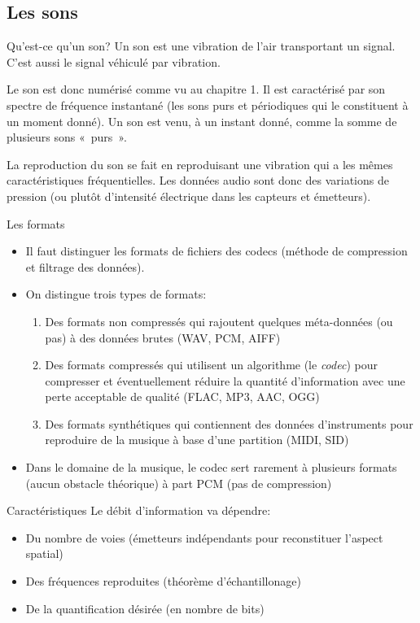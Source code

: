 \subsection{Les sons}
\begin{frame}{Qu'est-ce qu'un son?}
  Un son est une vibration de l'air transportant un signal. C'est aussi le
  signal véhiculé par vibration.

  Le son est donc numérisé comme vu au chapitre 1. Il est caractérisé par son
  spectre de fréquence instantané (les sons purs et périodiques qui le
  constituent à un moment donné). Un son est venu, à un instant donné, comme
  la somme de plusieurs sons «~purs~».
  
  La reproduction du son se fait en reproduisant une vibration qui a les mêmes
  caractéristiques fréquentielles. Les données audio sont donc des variations
  de pression (ou plutôt d'intensité électrique dans les capteurs et
  émetteurs).
\end{frame}
\begin{frame}{Les formats}
  \begin{itemize}
  \item Il faut distinguer les formats de fichiers des codecs (méthode de
    compression et filtrage des données).
  \item On distingue trois types de formats:
    \begin{enumerate}
    \item Des formats non compressés qui rajoutent quelques méta-données (ou
      pas) à des données brutes (WAV, PCM, AIFF)
    \item Des formats compressés qui utilisent un algorithme (le \emph{codec})
      pour compresser et éventuellement réduire la quantité d'information avec
      une perte acceptable de qualité (FLAC, MP3, AAC, OGG)
    \item Des formats synthétiques qui contiennent des données d'instruments
      pour reproduire de la musique à base d'une partition (MIDI, SID)
    \end{enumerate}
  \item[\ddialogwarning] Dans le domaine de la musique, le codec sert rarement
    à plusieurs formats (aucun obstacle théorique) à part PCM (pas de
    compression)
  \end{itemize}
  \begin{block}{Caractéristiques}
    Le débit d'information va dépendre:
    \begin{itemize}
    \item Du nombre de voies (émetteurs indépendants pour reconstituer
      l'aspect spatial)
    \item Des fréquences reproduites (théorème d'échantillonage)
    \item De la quantification désirée (en nombre de bits)
    \end{itemize}
  \end{block}
\end{frame}
